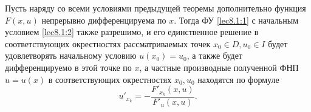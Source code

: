 \documentclass[../../main.tex]{subfiles}
\begin{document}
    \begin{thm}
		Пусть наряду со всеми условиями предыдущей теоремы дополнительно 
		функция $F(x, u)$ непрерывно дифференцируема по $x$. Тогда ФУ 
		\eqref{lec8.1:1} с начальным условием \eqref{lec8.1:2} также разрешимо, 
		и его единственное решение в соответствующих окрестностях 
		рассматриваемых точек $x_0 \in D, u_0 \in I$ будет удовлетворять 
		начальному условию $u(x_0)=u_0$, а также будет дифференцируемо в 
		этой точке по $x$, а частные производные полученной ФНП $u = u(x)$ в 
		соответствующих окрестностях $x_0, u_0$ находятся по формуле
		\begin{equation}
			u'_{x_k} = -\frac{F'_{x_k}(x,u)}{F'_u(x,u)}. \label{lec8.1:6}
		\end{equation}
    \end{thm}
\end{document}
